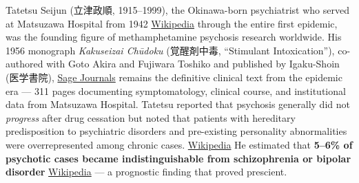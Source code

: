 Tatetsu Seijun (立津政順, 1915--1999), the Okinawa-born psychiatrist who served at Matsuzawa Hospital from 1942 \href{https://ja.wikipedia.org/wiki/\%E7\%AB\%8B\%E6\%B4\%A5\%E6\%94\%BF\%E9\%A0\%86}{Wikipedia} through the entire first epidemic, was the founding figure of methamphetamine psychosis research worldwide. His 1956 monograph \emph{Kakuseizai Chūdoku} (覚醒剤中毒, ``Stimulant Intoxication''), co-authored with Goto Akira and Fujiwara Toshiko and published by Igaku-Shoin (医学書院), \href{https://journals.sagepub.com/doi/10.1177/009145090803500410}{Sage Journals} remains the definitive clinical text from the epidemic era --- 311 pages documenting symptomatology, clinical course, and institutional data from Matsuzawa Hospital. Tatetsu reported that psychosis generally did not \emph{progress} after drug cessation but noted that patients with hereditary predisposition to psychiatric disorders and pre-existing personality abnormalities were overrepresented among chronic cases. \href{https://ja.wikipedia.org/wiki/\%E7\%B2\%BE\%E7\%A5\%9E\%E5\%88\%BA\%E6\%BF\%80\%E8\%96\%AC\%E7\%B2\%BE\%E7\%A5\%9E\%E7\%97\%85}{Wikipedia} He estimated that \textbf{5--6\% of psychotic cases became indistinguishable from schizophrenia or bipolar disorder} \href{https://ja.wikipedia.org/wiki/\%E7\%B2\%BE\%E7\%A5\%9E\%E5\%88\%BA\%E6\%BF\%80\%E8\%96\%AC\%E7\%B2\%BE\%E7\%A5\%9E\%E7\%97\%85}{Wikipedia} --- a prognostic finding that proved prescient.

